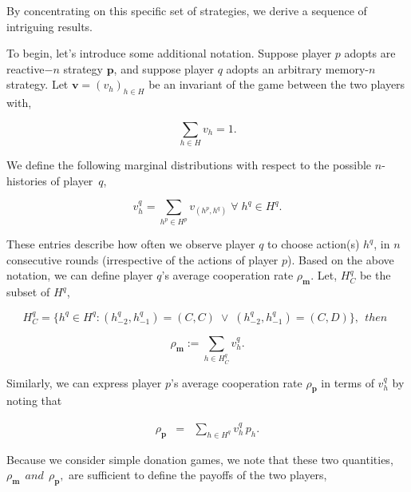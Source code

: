 \documentclass{article}
\theoremstyle{definition}
\begin{document}
By concentrating on this specific set of strategies, we derive a sequence of
intriguing results.

To begin, let's introduce some additional notation. Suppose player $p$ adopts
are reactive$-n$ strategy $\mathbf{p}$, and suppose player $q$ adopts an
arbitrary memory-$n$ strategy. Let $\mathbf{v}=(v_h)_{h\in H}$ be an invariant
of the game between the two players with,

\begin{equation}\label{eq:invariant_distribution_sum}
  \displaystyle \sum_{h \in H} v_h = 1.
\end{equation}

We define the following marginal distributions with respect to the possible $n$-histories of player~$q$,

\begin{equation}\label{Eq:marginal_distributions}
\displaystyle v^q_{h} = \sum_{h^p\in H^p} v_{(h^p,h^q)} \; \forall \; h^q \in H^q.
\end{equation}

These entries describe how often we observe player $q$ to choose action(s)
$h^q$, in $n$ consecutive rounds (irrespective of the actions of player $p$).
Based on the above notation, we can define player $q$'s average cooperation rate
$\rho_\mathbf{m}$. Let, $H^{q}_{C}$ be the subset of $H^{q}$,

\begin{equation}
  H^{q}_{C} = \{h^q \in H^q : (h^q_{-2}, h^q_{-1}) = (C, C) \; \lor \; (h^q_{-2}, h^q_{-1}) = (C, D)\}, ~~then~~
\end{equation}

\begin{equation} \label{Eq:rhoq_alln}
  \rho_\mathbf{m} := \displaystyle \sum_{h \in H^{q}_{C}} v^q_{h}.
\end{equation}

Similarly, we can express player $p$'s average cooperation rate
$\rho_\mathbf{p}$ in terms of $v^q_{h}$ by
noting that

\begin{equation} \label{Eq:rhop_alln}
  \begin{array}{lll}
    \rho_\mathbf{p} &= &\displaystyle \sum_{h \in H^q} v^q_{h}\, p_{h}.
  \end{array}
\end{equation}

Because we consider simple donation games, we note that these two quantities,
$\rho_\mathbf{m}  ~~and~~ \rho_\mathbf{p},$ are
sufficient to define the payoffs of the two players,
\end{document}
